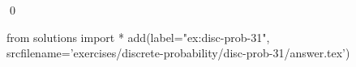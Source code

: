 
\begin{ex} 
  \label{ex:disc-prob-31}
  
  \qed
\end{ex} 
\begin{python0}
from solutions import *
add(label="ex:disc-prob-31",
    srcfilename='exercises/discrete-probability/disc-prob-31/answer.tex') 
\end{python0}
